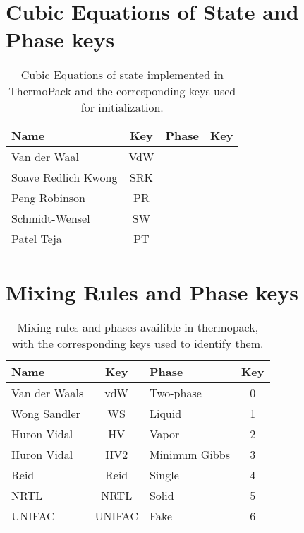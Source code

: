 \section{Cubic Equations of State and Phase keys}

\begin{table}[ht!]
    \centering
    \begin{tabular}{l c | l c}
    \toprule
        Name & Key & Phase & Key\\
    \midrule
        Van der Waal & VdW\\
        Soave Redlich Kwong & SRK\\
        Peng Robinson & PR\\
        Schmidt-Wensel & SW\\
        Patel Teja & PT\\
    \bottomrule
    \end{tabular}
    \caption{Cubic Equations of state implemented in ThermoPack and the corresponding keys used for initialization.}
    \label{tab:EoS_thermopack}
\end{table}

\section{Mixing Rules and Phase keys}
\begin{table}[ht!]
    \centering
    \begin{tabular}{l c | l c}
    \toprule
        Name & Key & Phase & Key\\
    \midrule
        Van der Waals & vdW & Two-phase & 0\\
        Wong Sandler & WS & Liquid & 1\\
        Huron Vidal & HV & Vapor & 2\\
        Huron Vidal & HV2 & Minimum Gibbs & 3\\
        Reid & Reid & Single & 4\\
        NRTL & NRTL & Solid & 5\\
        UNIFAC & UNIFAC & Fake & 6\\
    \bottomrule
    \end{tabular}
    \caption{Mixing rules and phases availible in thermopack, with the corresponding keys used to identify them.}
    \label{tab:mixing_rules_thermopack}
\end{table}